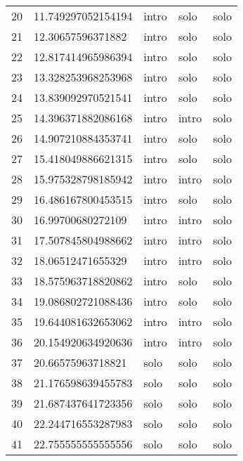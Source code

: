 \begin{table}[]
\begin{tabular}{lllll}
    20   & 11.749297052154194 & intro        & solo            & solo           \\
    21   & 12.30657596371882  & intro        & solo            & solo           \\
    22   & 12.817414965986394 & intro        & solo            & solo           \\
    23   & 13.328253968253968 & intro        & solo            & solo           \\
    24   & 13.839092970521541 & intro        & solo            & solo           \\
    25   & 14.396371882086168 & intro        & intro           & solo           \\
    26   & 14.907210884353741 & intro        & solo            & solo           \\
    27   & 15.418049886621315 & intro        & solo            & solo           \\
    28   & 15.975328798185942 & intro        & intro           & solo           \\
    29   & 16.486167800453515 & intro        & solo            & solo           \\
    30   & 16.99700680272109  & intro        & intro           & solo           \\
    31   & 17.507845804988662 & intro        & intro           & solo           \\
    32   & 18.06512471655329  & intro        & intro           & solo           \\
    33   & 18.575963718820862 & intro        & solo            & solo           \\
    34   & 19.086802721088436 & intro        & solo            & solo           \\
    35   & 19.644081632653062 & intro        & intro           & solo           \\
    36   & 20.154920634920636 & intro        & intro           & solo           \\
    37   & 20.66575963718821  & solo         & solo            & solo           \\
    38   & 21.176598639455783 & solo         & solo            & solo           \\
    39   & 21.687437641723356 & solo         & solo            & solo           \\
    40   & 22.244716553287983 & solo         & solo            & solo           \\
    41   & 22.755555555555556 & solo         & solo            & solo           \\

\end{tabular}
\end{table}
